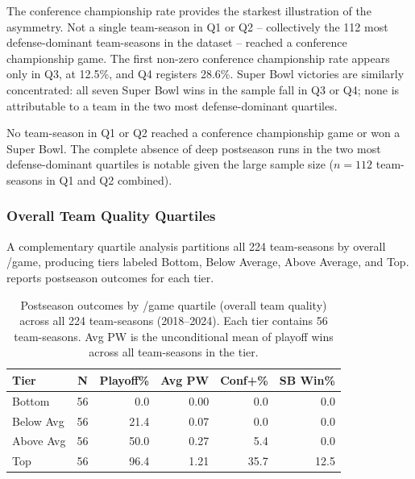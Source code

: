 The conference championship rate provides the starkest illustration of the
asymmetry. Not a single team-season in Q1 or Q2 -- collectively the 112 most
defense-dominant team-seasons in the dataset -- reached a conference
championship game. The first non-zero conference championship rate appears only
in Q3, at 12.5\%, and Q4 registers 28.6\%. Super Bowl victories are similarly
concentrated: all seven Super Bowl wins in the sample fall in Q3 or Q4; none
is attributable to a team in the two most defense-dominant quartiles.

No team-season in Q1 or Q2 reached a conference championship game or won a
Super Bowl. The complete absence of deep postseason runs in the two most
defense-dominant quartiles is notable given the large sample size ($n = 112$
team-seasons in Q1 and Q2 combined).

\subsubsection{Overall Team Quality Quartiles}
\label{sec:gds-quartiles}

A complementary quartile analysis partitions all 224 team-seasons by overall
\gds{}/game, producing tiers labeled Bottom, Below Average, Above Average, and
Top.  reports postseason outcomes for each tier.

\begin{table}[htbp]
  \centering
  \caption{Postseason outcomes by \gds{}/game quartile (overall team quality)
           across all 224 team-seasons (2018--2024). Each tier contains 56
           team-seasons. Avg PW is the unconditional mean of playoff wins
           across all team-seasons in the tier.}
  \label{tab:quartile-gds}
  \begin{tabular}{lcrrrr}
    \toprule
    \textbf{Tier} & \textbf{N}
      & \textbf{Playoff\%} & \textbf{Avg PW}
      & \textbf{Conf+\%} & \textbf{SB Win\%} \\
    \midrule
    Bottom     & 56 & \phantom{0}0.0 & 0.00 & 0.0 & 0.0 \\
    Below Avg  & 56 & 21.4           & 0.07 & 0.0 & 0.0 \\
    Above Avg  & 56 & 50.0           & 0.27 & 5.4 & 0.0 \\
    Top        & 56 & 96.4           & 1.21 & 35.7 & 12.5 \\
    \bottomrule
  \end{tabular}
\end{table}

